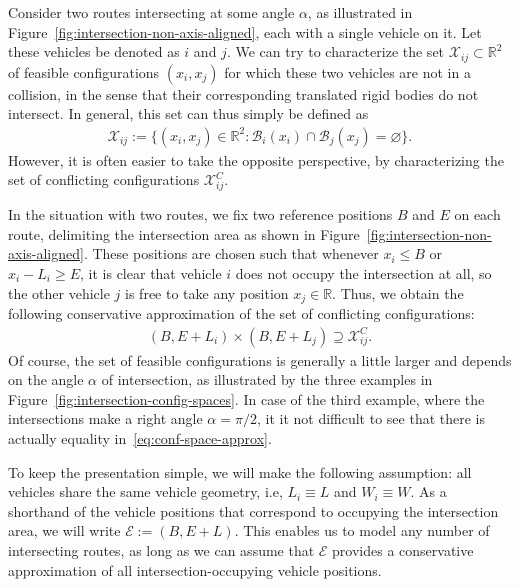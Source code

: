 \documentclass[a4paper]{report}
\newcounter{mycomment}
\newcommand{\comment}[2][]{%
    \refstepcounter{mycomment}%
    {%
        \setstretch{0.7}%
        \StrLeft{#2}{60}[\shortcaption]%
        \todo[%
        color={red!100!green!33},%
        size=\small,%
        caption={\protect\hypertarget{todo\themycomment}{}\textit{\thesubsection}%
        \hspace{1.0em}{\shortcaption}~\textit{[\themycomment]}}, #1]%
        {%
        #2~\hyperlink{todo\themycomment}{\textit{[\themycomment]}}}
    }%
}
\theoremstyle{definition}
\theoremstyle{plain}
\begin{document}
Consider two routes intersecting at some angle $\alpha$, as illustrated in
Figure~\ref{fig:intersection-non-axis-aligned}, each with a single vehicle on
it. Let these vehicles be denoted as $i$ and $j$.
%
We can try to characterize the set $\mathcal{X}_{ij} \subset \mathbb{R}^{2}$ of
feasible configurations $(x_{i}, x_{j})$ for which these two vehicles are not in
a collision, in the sense that their corresponding translated rigid bodies do
not intersect.
%
In general, this set can thus simply be defined as
\begin{align}
  \label{eq:3}
  \mathcal{X}_{ij} := \{ (x_{i}, x_{j}) \in \mathbb{R}^{2} : \mathcal{B}_{i}(x_{i}) \cap \mathcal{B}_{j}(x_{j}) = \varnothing \} .
\end{align}
%
However, it is often easier to take the opposite perspective, by characterizing
the set of conflicting configurations $\mathcal{X}_{ij}^{C}$.

%
In the situation with two routes, we fix two reference positions $B$ and $E$ on
each route, delimiting the intersection area as shown in
Figure~\ref{fig:intersection-non-axis-aligned}.
%
These positions are chosen such that whenever $x_{i} \leq B$ or
$x_{i} - L_{i} \geq E$, it is clear that vehicle $i$ does not occupy the intersection
at all, so the other vehicle $j$ is free to take any position
$x_{j} \in \mathbb{R}$.
%
Thus, we obtain the following conservative approximation of the set of conflicting
configurations:
\begin{align}\label{eq:conf-space-approx}
  (B,E + L_{i}) \times (B, E + L_{j}) \supseteq \mathcal{X}_{ij}^{C} .
\end{align}
Of course, the set of feasible configurations is generally a little larger and
depends on the angle $\alpha$ of intersection, as illustrated by the three examples
in Figure~\ref{fig:intersection-config-spaces}.
%
In case of the third example, where the intersections make a right angle
$\alpha = \pi/2$, it it not difficult to see that there is actually equality in~\eqref{eq:conf-space-approx}.

To keep the presentation simple, we will make the following assumption: all
vehicles share the same vehicle geometry, i.e, $L_{i} \equiv L$ and
$W_{i} \equiv W$. As a shorthand of the vehicle positions that correspond to
occupying the intersection area, we will write $\mathcal{E} := (B, E + L)$.
%
This enables us to model any number of intersecting routes, as long as we can
assume that $\mathcal{E}$ provides a conservative approximation of all
intersection-occupying vehicle positions.
\end{document}

